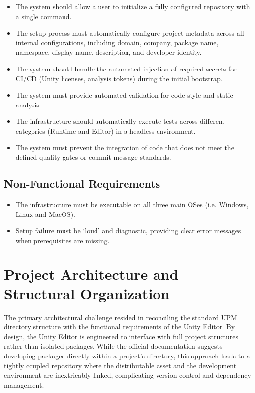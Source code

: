 \begin{itemize}
	\item The system should allow a user to initialize a fully configured repository with a single command.
	\item The setup process must automatically configure project metadata across all internal configurations, including domain, company, package name, namespace, display name, description, and developer identity.
	\item The system should handle the automated injection of required secrets for CI/CD (Unity licenses, analysis tokens) during the initial bootstrap.
	\item The system must provide automated validation for code style and static analysis.
	\item The infrastructure should automatically execute tests across different categories (Runtime and Editor) in a headless environment.
	\item The system must prevent the integration of code that does not meet the defined quality gates or commit message standards.
\end{itemize}

\subsection{Non-Functional Requirements}

\begin{itemize}
	\item The infrastructure must be executable on all three main OSes (i.e. Windows, Linux and MacOS).
	\item Setup failure must be `loud' and diagnostic, providing clear error messages when prerequisites are missing.
\end{itemize}

\section{Project Architecture and Structural Organization}

The primary architectural challenge resided in reconciling the standard \ac{UPM} directory structure with the functional requirements of the Unity Editor. By design, the Unity Editor is engineered to interface with full project structures rather than isolated packages. While the official documentation suggests developing packages directly within a project's  directory, this approach leads to a tightly coupled repository where the distributable asset and the development environment are inextricably linked, complicating version control and dependency management.

